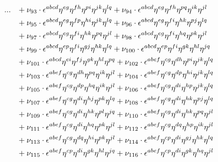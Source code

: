 \documentclass[a4paper,12pt, DIV=14, BCOR=5mm, twoside, headsepline, numbers=noenddot]{scrbook}
\begin{document}
\begin{align}\label{LorentzArea3}
\begin{alignedat}{2}
\hphantom{\boldsymbol{a^{ABpCq}}}&\hphantom{:} \ \ \ & \hphantom{a^{abcdefghpijklq}} ...  &\hphantom{=} +
\nu_{93}\cdot\epsilon^{abcd}\eta^{eg}\eta^{fh}\eta^{pi}\eta^{jk}\eta^{lq}+\nu_{94}\cdot\epsilon^{abcd}\eta^{eg}\eta^{fh}\eta^{pq}\eta^{ik}\eta^{jl}\\
& & &\hphantom{=}
+\nu_{95}\cdot\epsilon^{abcd}\eta^{eg}\eta^{fp}\eta^{hi}\eta^{jk}\eta^{lq}+\nu_{96}\cdot\epsilon^{abcd}\eta^{eg}\eta^{fi}\eta^{hk}\eta^{pj}\eta^{lq}\\
& & &\hphantom{=}
+\nu_{97}\cdot\epsilon^{abcd}\eta^{eg}\eta^{fi}\eta^{hk}\eta^{pq}\eta^{jl}+\nu_{98}\cdot\epsilon^{abcd}\eta^{eg}\eta^{fi}\eta^{hq}\eta^{pk}\eta^{jl}\\
& & &\hphantom{=}
+\nu_{99}\cdot\epsilon^{abcd}\eta^{ep}\eta^{fi}\eta^{gj}\eta^{hk}\eta^{lq}+\nu_{100}\cdot\epsilon^{abcd}\eta^{ep}\eta^{fi}\eta^{gk}\eta^{hl}\eta^{jq}\\
& & &\hphantom{=}
+\nu_{101}\cdot\epsilon^{abcd}\eta^{ei}\eta^{fj}\eta^{gk}\eta^{hl}\eta^{pq}+\nu_{102}\cdot\epsilon^{abef}\eta^{cg}\eta^{dh}\eta^{pi}\eta^{jk}\eta^{lq}\\
& & &\hphantom{=}
+\nu_{103}\cdot\epsilon^{abef}\eta^{cg}\eta^{dh}\eta^{pq}\eta^{ik}\eta^{jl}+\nu_{104}\cdot\epsilon^{abef}\eta^{cg}\eta^{dp}\eta^{hi}\eta^{jk}\eta^{lq}\\
& & &\hphantom{=}
+\nu_{105}\cdot\epsilon^{abef}\eta^{cg}\eta^{dp}\eta^{hq}\eta^{ik}\eta^{jl}+\nu_{106}\cdot\epsilon^{abef}\eta^{cg}\eta^{di}\eta^{hp}\eta^{jk}\eta^{lq}\\
& & &\hphantom{=}
+\nu_{107}\cdot\epsilon^{abef}\eta^{cg}\eta^{di}\eta^{hj}\eta^{pk}\eta^{lq}+\nu_{108}\cdot\epsilon^{abef}\eta^{cg}\eta^{di}\eta^{hk}\eta^{pj}\eta^{lq}\\
& & &\hphantom{=}
+\nu_{109}\cdot\epsilon^{abef}\eta^{cg}\eta^{di}\eta^{hk}\eta^{pl}\eta^{jq}+\nu_{110}\cdot\epsilon^{abef}\eta^{cg}\eta^{di}\eta^{hk}\eta^{pq}\eta^{jl}\\
& & &\hphantom{=}
+\nu_{111}\cdot\epsilon^{abef}\eta^{cg}\eta^{di}\eta^{hq}\eta^{pk}\eta^{jl}+\nu_{112}\cdot\epsilon^{abef}\eta^{cg}\eta^{dq}\eta^{hp}\eta^{ik}\eta^{jl}\\
& & &\hphantom{=}
+\nu_{113}\cdot\epsilon^{abef}\eta^{cg}\eta^{dq}\eta^{hi}\eta^{pk}\eta^{jl}+\nu_{114}\cdot\epsilon^{abef}\eta^{cp}\eta^{di}\eta^{gj}\eta^{hk}\eta^{lq}\\
& & &\hphantom{=}
+\nu_{115}\cdot\epsilon^{abef}\eta^{cp}\eta^{di}\eta^{gk}\eta^{hl}\eta^{jq}+\nu_{116}\cdot\epsilon^{abef}\eta^{cp}\eta^{di}\eta^{gk}\eta^{hq}\eta^{jl}\\

\end{alignedat}
\end{align}
\end{document}
